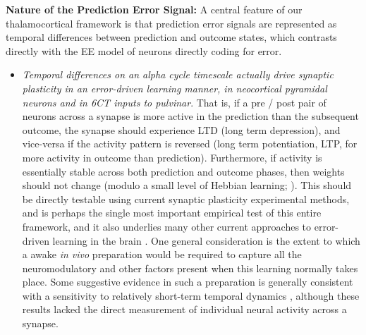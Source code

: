 \documentclass[11pt,twoside]{article}
\newif\myifpdf
\begin{document}
{\bf Nature of the Prediction Error Signal:} A central feature of our thalamocortical framework is that prediction error signals are represented as temporal differences between prediction and outcome states, which contrasts directly with the EE model of neurons directly coding for error.
\begin{itemize}
	\item \emph{Temporal differences on an alpha cycle timescale actually drive synaptic plasticity in an error-driven learning manner, in neocortical pyramidal neurons and in 6CT inputs to pulvinar}.  That is, if a pre / post pair of neurons across a synapse is more active in the prediction than the subsequent outcome, the synapse should experience LTD (long term depression), and vice-versa if the activity pattern is reversed (long term potentiation, LTP, for more activity in outcome than prediction).  Furthermore, if activity is essentially stable across both prediction and outcome phases, then weights should not change (modulo a small level of Hebbian learning; ).  This should be directly testable using current synaptic plasticity experimental methods, and is perhaps the single most important empirical test of this entire framework, and it also underlies many other current approaches to error-driven learning in the brain \cite{BengioMesnardFischerEtAl17,WhittingtonBogacz19,LillicrapSantoroMarrisEtAl20}.  One general consideration is the extent to which a awake \emph{in vivo} preparation would be required to capture all the neuromodulatory and other factors present when this learning normally takes place.  Some suggestive evidence in such a preparation is generally consistent with a sensitivity to relatively short-term temporal dynamics \cite{LimMcKeeWoloszynEtAl15}, although these results lacked the direct measurement of individual neural activity across a synapse.

\end{itemize}
\end{document}
